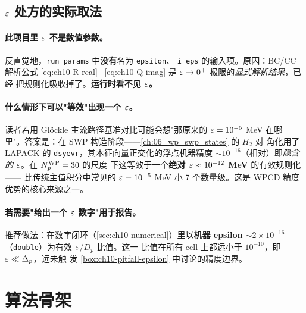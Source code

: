 \subsection{\(\varepsilon\) 处方的实际取法}
\label{subsec:ch10-epsilon}

\paragraph{此项目里 \(\varepsilon\) 不是数值参数。}
反直觉地，\texttt{run\_params} 中\textbf{没有}名为 \texttt{epsilon}、
\texttt{i\_eps} 的输入项。原因：BC/CC 解析公式 \cref{eq:ch10-R-real}--
\cref{eq:ch10-Q-imag} 是 \(\varepsilon \to 0^{+}\) 极限的\emph{显式解析结果}，已经
把规则化吸收掉了。\textbf{运行时看不见 \(\varepsilon\)。}

\paragraph{什么情形下可以"等效"出现一个 \(\varepsilon\)。}
读者若用 Glöckle 主流路径基准对比可能会想"那原来的 \(\varepsilon = 10^{-5}\) MeV 在哪
里"。答案是：在 SWP 构造阶段——\cref{ch:06_wp_swp_states} 的 \(H_2\) 对
角化用了 LAPACK 的 \texttt{dsyevr}，其本征向量正交化的浮点机器精度
\(\sim 10^{-16}\)（相对）即\emph{隐含的 \(\varepsilon\)}。在 \({N_{p}^{\text{WP}}} = 30\) 的尺度
下这等效于一个\textbf{绝对 \(\varepsilon \approx 10^{-12}\) MeV} 的有效规则化——
比传统主值积分中常见的 \(\varepsilon = 10^{-5}\) MeV 小 7 个数量级。这是 WPCD
精度优势的核心来源之一。

\paragraph{若需要"给出一个 \(\varepsilon\) 数字"用于报告。}
推荐做法：在数字闭环（\cref{sec:ch10-numerical}）里以\textbf{机器 epsilon
\(\sim 2\times 10^{-16}\)}（\texttt{double}）为有效 \(\varepsilon\)/\(D_p\) 比值。这一
比值在所有 cell 上都远小于 \(10^{-10}\)，即 \(\varepsilon \ll \Delta_p\)，远未触
发 \cref{box:ch10-pitfall-epsilon} 中讨论的精度边界。

\section{算法骨架}
\label{sec:ch10-algorithm}

